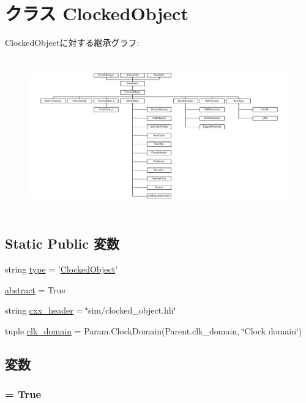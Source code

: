 \hypertarget{classClockedObject_1_1ClockedObject}{
\section{クラス ClockedObject}
\label{classClockedObject_1_1ClockedObject}
}
ClockedObjectに対する継承グラフ:\begin{figure}[H]
\begin{center}
\leavevmode
\includegraphics[height=6.76329cm]{classClockedObject_1_1ClockedObject}
\end{center}
\end{figure}
\subsection*{Static Public 変数}
\begin{DoxyCompactItemize}
\item 
string \hyperlink{classClockedObject_1_1ClockedObject_acce15679d830831b0bbe8ebc2a60b2ca}{type} = '\hyperlink{classClockedObject_1_1ClockedObject}{ClockedObject}'
\item 
\hyperlink{classClockedObject_1_1ClockedObject_a17fa61ac3806b481cafee5593b55e5d0}{abstract} = True
\item 
string \hyperlink{classClockedObject_1_1ClockedObject_a17da7064bc5c518791f0c891eff05fda}{cxx\_\-header} = \char`\"{}sim/clocked\_\-object.hh\char`\"{}
\item 
tuple \hyperlink{classClockedObject_1_1ClockedObject_a596968ab1b20165f058769abb6d2f6ca}{clk\_\-domain} = Param.ClockDomain(Parent.clk\_\-domain, \char`\"{}Clock domain\char`\"{})
\end{DoxyCompactItemize}


\subsection{変数}
\hypertarget{classClockedObject_1_1ClockedObject_a17fa61ac3806b481cafee5593b55e5d0}{
\subsubsection[{abstract}]{ = True}}
\label{classClockedObject_1_1ClockedObject_a17fa61ac3806b481cafee5593b55e5d0}


